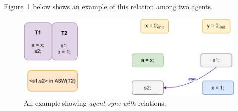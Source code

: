             Figure~\ref{model:agent-sync-with} below shows an example of this relation among two agents. 
            \begin{figure}[H]
                \centering
                \includegraphics[scale=0.7]{3.ECMAScriptMemoryModel/AgentSyncWith.pdf}
                \caption{An example showing \textit{agent-sync-with} relations.}
                \label{model:agent-sync-with}
            \end{figure}
        
